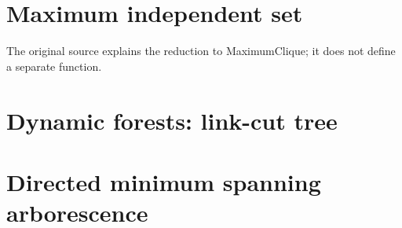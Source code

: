 \section{Maximum independent set}
The original source explains the reduction to MaximumClique; it does not define a separate function.

\section{Dynamic forests: link-cut tree}

\section{Directed minimum spanning arborescence}


